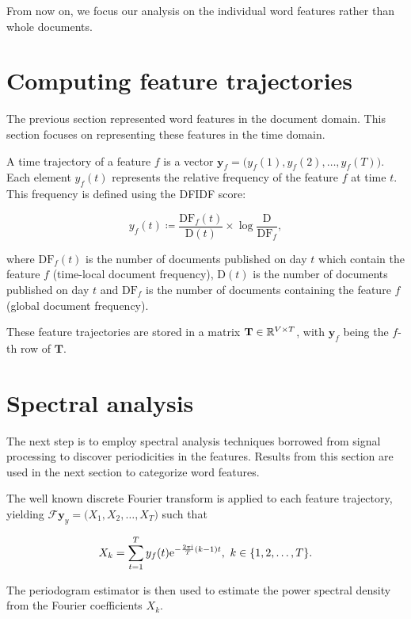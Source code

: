 From now on, we focus our analysis on the individual word features rather than whole documents.

\section{Computing feature trajectories}
The previous section represented word features in the document domain. This section focuses on representing these features in the time domain.

A time trajectory of a feature $f$ is a vector $\mathbf{y}_f = \big(y_{f}(1), y_{f}(2), \dots, y_{f}(T)\big)$. Each element $y_{f}(t)$ represents the relative frequency of the feature $f$ at time $t$. This frequency is defined using the DFIDF score:

\begin{equation}
	y_{f}(t) \coloneqq \frac{\text{DF}_{f}(t)}{\text{D}(t)} \times \log{\frac{\text{D}}{\text{DF}_{f}}},
\end{equation}

where $\text{DF}_{f}(t)$ is the number of documents published on day $t$ which contain the feature $f$ (time-local document frequency), $\text{D}(t)$ is the number of documents published on day $t$ and $\text{DF}_{f}$ is the number of documents containing the feature $f$ (global document frequency).

These feature trajectories are stored in a matrix $\mathbf{T} \in \mathbb{R}^{V \times T}$, with $\mathbf{y}_f$ being the $f$-th row of $\mathbf{T}$.


\section{Spectral analysis}
The next step is to employ spectral analysis techniques borrowed from signal processing to discover periodicities in the features. Results from this section are used in the next section to categorize word features.

The well known discrete Fourier transform is applied to each feature trajectory, yielding $\mathcal{F} \mathbf{y}_y = \big(X_{1}, X_{2}, \dots, X_{T}\big)$ such that

\begin{equation}
	X_{k} = \sum_{t = 1}^{T}{y_{f}(t) \mathrm{e}^{- \frac{2 \pi \mathrm{i}}{T} (k - 1) t}}, ~ k \in \{1, 2, \dots, T\}.
\end{equation}

The periodogram estimator is then used to estimate the power spectral density from the Fourier coefficients $X_{k}$.

